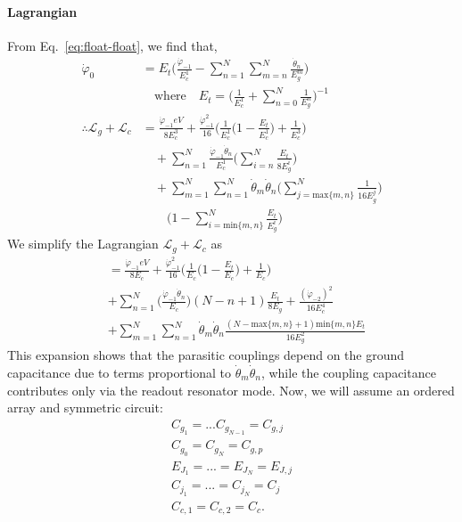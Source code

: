 \documentclass[%
reprint,
superscriptaddress,
 amsmath,amssymb,
 aps,
 prx,
longbibliography,
floatfix,
]{revtex4-2}
\begin{document}
\paragraph{Lagrangian} 
From Eq.~\ref{eq:float-float}, we find that, 
\begin{align}
    \dot{\varphi}_0&=E_t\Big(\frac{\dot{\varphi}_{-1}}{E_c^1}-\sum_{n=1}^N\sum_{m=n}^N\frac{\dot{\theta}_n}{E^m_g}\Big)\\&\quad\text{where}\quad E_t=\Big(\frac{1}{E_c^1}+\sum_{n=0}^N\frac{1}{E^n_g}\Big)^{-1}\nonumber\\
\therefore     \mathcal{L}_g+\mathcal{L}_c&=\frac{\dot{\varphi}_{-1}eV}{8E^3_c}+\frac{\dot{\varphi}^2_{-1}}{16}\Big(\frac{1}{E^1_c}\Big(1-\frac{E_t}{E_c^1}\Big)+\frac{1}{E^3_c}\Big)\nonumber\\&\quad+\sum_{n=1}^N\frac{\dot{\varphi}_{-1}\dot{\theta}_n}{E_c^1}\Big(\sum_{i=n}^N\frac{E_t}{8E^i_g}\Big)\nonumber\\&\quad+\sum_{m=1}^N\sum_{n=1}^N\dot{\theta}_m\dot{\theta}_{n}\Big( \sum_{j=\text{max}\{m,n\}}^N\frac{1}{16E_g^j}\Big)\nonumber\\&\quad\quad\Big(1-\sum_{i=\text{min}\{m,n\}}^N\frac{E_t}{E_g^i}\Big)
\end{align}
We simplify the Lagrangian $\mathcal{L}_g+\mathcal{L}_c$ as
\begin{align}
    &=\frac{\dot{\varphi}_{-1}eV}{8E_c}+\frac{\dot{\varphi}^2_{-1}}{16}\Big(\frac{1}{E_c}\Big(1-\frac{E_t}{E_c}\Big)+\frac{1}{E_c}\Big)\nonumber\\&+\sum_{n=1}^N\Big(\frac{\dot{\varphi}_{-1}\dot{\theta}_n}{E_c}\Big)(N-n+1)\frac{E_t}{8E_g}+\frac{(\dot{\varphi}_{-2})^2}{16E^4_{c}}\nonumber\\
&+\sum_{m=1}^N\sum_{n=1}^N\dot{\theta}_m\dot{\theta}_{n} \frac{(N-\text{max}\{m,n\}+1)\text{min}\{m,n\}E_t}{16E_g^2}
\end{align}
This expansion shows that the parasitic couplings depend on the ground capacitance due to terms proportional to $\dot{\theta}_m\dot{\theta}_n$, while the coupling capacitance contributes only via  the readout resonator mode. Now, we will assume an ordered array and symmetric circuit:
\begin{align*}
    C_{g_1}=...C_{g_{N-1}}=C_{g,j} \\
    C_{g_0}=C_{g_N}=C_{g,p} \\
    E_{J_1}=...=E_{J_N}=E_{J,j} \\
    C_{j_1}=...=C_{j_N}=C_{j} \\
    C_{c,1}=C_{c,2}=C_{c}.
\end{align*}
\end{document}
